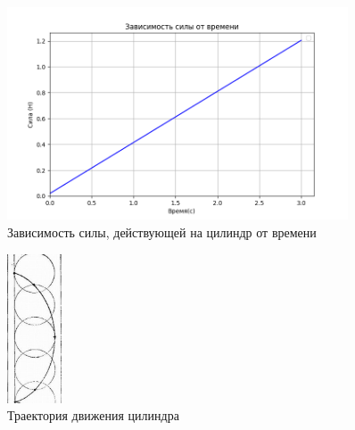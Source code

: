 \documentclass[a4paper]{article}
\begin{document}
\begin{figure}[h]
\begin{center}
\includegraphics[width=0.9\textwidth]{pick4.PNG}
\caption{Зависимость силы, действующей на цилиндр от времени}
\end{center}
\end{figure}

\begin{figure}[h]
\begin{center}
\includegraphics[width=0.145\textwidth]{pick5.jpg}
\caption{Траектория движения цилиндра}
\end{center}
\end{figure}
\end{document}
